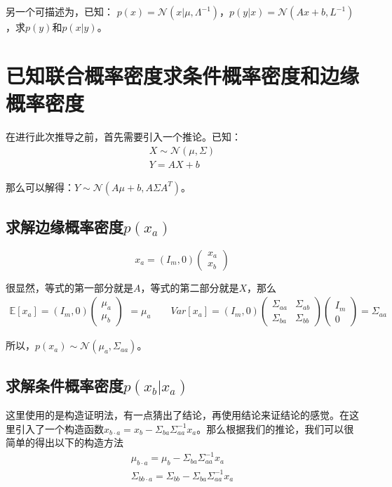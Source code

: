 \documentclass[a4paper]{article}
\begin{document}
另一个可描述为，已知：
$p(x)=\mathcal{N}(x|\mu,\Lambda^{-1})$，$p(y|x)=\mathcal{N}(Ax+b,L^{-1})$，求$p(y)$和$p(x|y)$。

\section{已知联合概率密度求条件概率密度和边缘概率密度}
在进行此次推导之前，首先需要引入一个推论。已知：
\begin{gather}
    X\sim \mathcal{N}(\mu,\Sigma) \\
    Y = AX + b
\end{gather}

那么可以解得：$Y\sim \mathcal{N}(A\mu+b, A\Sigma A^T)$。
\subsection{求解边缘概率密度$p(x_a)$}
\begin{equation}
    x_a = (I_m,0)
    \begin{pmatrix}
        x_a \\
        x_b
    \end{pmatrix}
\end{equation}

很显然，等式的第一部分就是$A$，等式的第二部分就是$X$，那么
\begin{equation}
    \begin{split}
        \mathbb{E}[x_a]=(I_m,0)
    \begin{pmatrix}
        \mu_a \\
        \mu_b
    \end{pmatrix}
    \end{split}=\mu_a \qquad
    Var[x_a] = (I_m,0)
    \begin{pmatrix}
    \Sigma_{aa} & \Sigma_{ab} \\
    \Sigma_{ba} & \Sigma_{bb} 
    \end{pmatrix}
    \begin{pmatrix}
    I_m \\
    0  
    \end{pmatrix}=\Sigma_{aa}
\end{equation}

所以，$p(x_a)\sim \mathcal{N}(\mu_a, \Sigma_{aa})$。

\subsection{求解条件概率密度$p(x_b|x_a)$}
这里使用的是构造证明法，有一点猜出了结论，再使用结论来证结论的感觉。在这里引入了一个构造函数$x_{b\cdot a}=x_b-\Sigma_{ba}\Sigma_{aa}^{-1}x_a$。那么根据我们的推论，我们可以很简单的得出以下的构造方法
\begin{gather}
    \mu_{b\cdot a}= \mu_b-\Sigma_{ba}\Sigma_{aa}^{-1}x_a \\
    \Sigma_{bb \cdot a} = \Sigma_{bb}-\Sigma_{ba}\Sigma_{aa}^{-1}x_a 
\end{gather}
\end{document}
